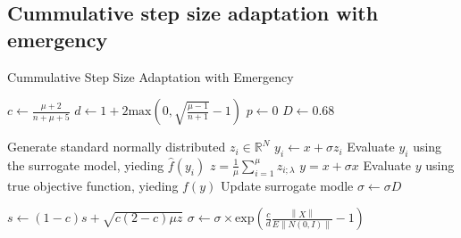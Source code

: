\subsection{Cummulative step size adaptation with emergency}

\begin{algorithm}
\caption{Cummulative Step Size Adaptation with Emergency}
\label{alg:CSA_with_emergency}
\begin{algorithmic}[1]
\STATE $c \leftarrow  \frac{\mu +2}{n+\mu+5}$ 
\STATE $d \leftarrow 1 + 2 \text{max}(0, \sqrt{\frac{\mu - 1}{n+1} } - 1 ) $
\STATE $p \leftarrow 0$
\STATE $D \leftarrow 0.68$

		\STATE Generate standard normally distributed $z_i \in \mathbb{R}^N $
		\STATE $y_i \leftarrow x + \sigma z_i$
		\STATE Evaluate $y_i$ using the surrogate model, yieding $\hat{f}(y_i)$
	\ENDFOR
	\STATE $z = \frac{1}{\mu} \sum_{i=1}^{\mu} z_{i;\lambda}$
	\STATE $y = x + \sigma x$
	\STATE Evaluate $y$ using true objective function, yieding $f(y)$
	\STATE Update surrogate modle 
		\STATE $\sigma \leftarrow \sigma D$
		
	\ELSE
		\STATE $s \leftarrow (1-c)s + \sqrt{ c(2-c) \mu z}$
		\STATE $\sigma \leftarrow \sigma \times \text{exp} \left(\frac{c}{d} \frac{\left\lVert X \right\rVert} { E \left\lVert N(0,I) \right\rVert} -1 \right )$
		
	\ENDIF


\ENDWHILE
\end{algorithmic}
\end{algorithm}

